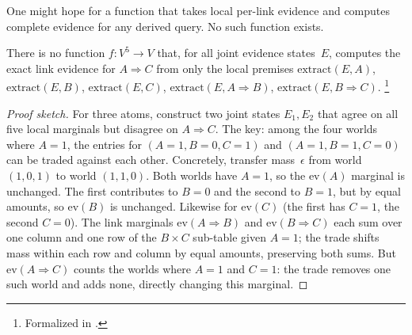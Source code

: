 \documentclass[11pt,openany]{report}
\begin{document}
One might hope for a function that takes local per-link evidence and
computes complete evidence for any derived query.  No such function
exists.

\begin{theorem}
\label{thm:no-go}
There is no function $f : V^5 \to V$ that, for all joint evidence
states~$E$, computes the exact link evidence for $A \Rightarrow C$
from only the local premises $\mathrm{extract}(E, A)$,
$\mathrm{extract}(E, B)$, $\mathrm{extract}(E, C)$,
$\mathrm{extract}(E, A \!\Rightarrow\! B)$,
$\mathrm{extract}(E, B \!\Rightarrow\! C)$.%
\footnote{Formalized in
.}
\end{theorem}

\begin{proof}[Proof sketch]
For three atoms, construct two joint states $E_1, E_2$ that agree on
all five local marginals but disagree on $A \Rightarrow C$.  The key:
among the four worlds where $A = 1$, the entries for
$(A\!=\!1, B\!=\!0, C\!=\!1)$ and $(A\!=\!1, B\!=\!1, C\!=\!0)$ can be
traded against each other.  Concretely, transfer mass~$\epsilon$
from world $(1,0,1)$ to world $(1,1,0)$.  Both worlds have $A = 1$,
so the $\mathrm{ev}(A)$ marginal is unchanged.  The first contributes
to $B\!=\!0$ and the second to $B\!=\!1$, but by equal amounts, so
$\mathrm{ev}(B)$ is unchanged.  Likewise for $\mathrm{ev}(C)$ (the
first has $C\!=\!1$, the second $C\!=\!0$).  The link marginals
$\mathrm{ev}(A\!\Rightarrow\!B)$ and $\mathrm{ev}(B\!\Rightarrow\!C)$
each sum over one column and one row of the $B \times C$ sub-table
given $A\!=\!1$; the trade shifts mass within each row and column by
equal amounts, preserving both sums.  But $\mathrm{ev}(A\!\Rightarrow\!C)$
counts the worlds where $A\!=\!1$ and $C\!=\!1$: the trade removes one
such world and adds none, directly changing this marginal.
\end{proof}
\end{document}
